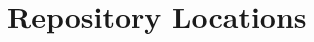 \documentclass[class=report,11pt,crop=false]{standalone}
\begin{document}
\chapter{Repository Locations}


\ifstandalone
% 
\fi
\end{document}
